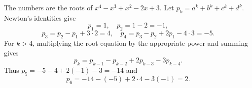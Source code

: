 The numbers are the roots of $x^4-x^3+x^2-2x+3$. Let $p_k=a^k+b^k+c^k+d^k$. Newton's identities give
\[
p_1=1,\quad p_2=1-2=-1,
\]
\[
p_3=p_2-p_1+3\cdot2=4,\quad
p_4=p_3-p_2+2p_1-4\cdot3=-5.
\]
For $k>4$, multiplying the root equation by the appropriate power and summing gives
\[
p_k=p_{k-1}-p_{k-2}+2p_{k-3}-3p_{k-4}.
\]
Thus $p_5=-5-4+2(-1)-3=-14$ and
\[
p_6=-14-(-5)+2\cdot4-3(-1)=\boxed2.
\]

